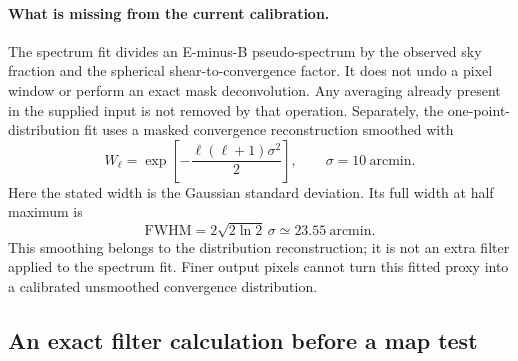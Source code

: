 \documentclass[11pt]{article}
\begin{document}
\paragraph{What is missing from the current calibration.}
The spectrum fit divides an E-minus-B pseudo-spectrum by the observed sky
fraction and the spherical shear-to-convergence factor. It does not undo
a pixel window or perform an exact mask deconvolution. Any averaging
already present in the supplied input is not removed by that operation.
Separately, the one-point-distribution fit uses a masked convergence
reconstruction smoothed with
\begin{equation}
 W_\ell=\exp\left[-\frac{\ell(\ell+1)\sigma^2}{2}\right],
 \qquad \sigma=10\ \mathrm{arcmin}.
\end{equation}
Here the stated width is the Gaussian standard deviation. Its full width
at half maximum is
\begin{equation}
 \mathrm{FWHM}=2\sqrt{2\ln2}\,\sigma\simeq23.55\ \mathrm{arcmin}.
\end{equation}
This smoothing belongs to the distribution reconstruction; it is not an
extra filter applied to the spectrum fit. Finer output pixels cannot turn
this fitted proxy into a calibrated unsmoothed convergence distribution.

\subsection{An exact filter calculation before a map test}
\end{document}
